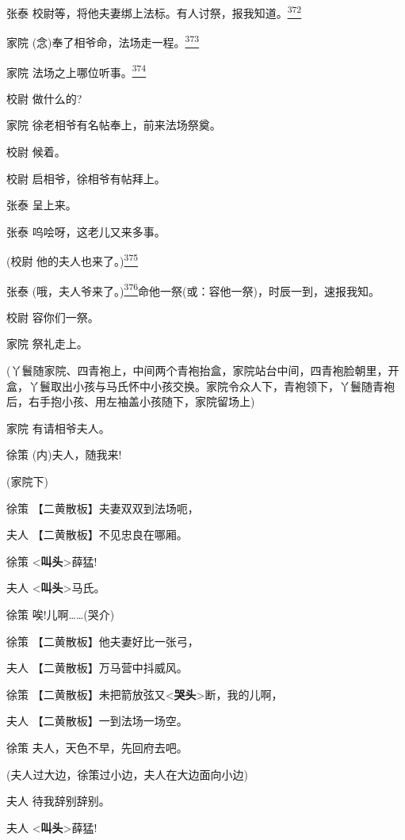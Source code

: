 张泰
校尉等，将他夫妻绑上法标。有人讨祭，报我知道。\protect\hyperlink{fn372}{\textsuperscript{372}}

家院
(念)奉了相爷命，法场走一程。\protect\hyperlink{fn373}{\textsuperscript{373}}

家院 法场之上哪位听事。\protect\hyperlink{fn374}{\textsuperscript{374}}

校尉 做什么的?

家院 徐老相爷有名帖奉上，前来法场祭奠。

校尉 候着。

校尉 启相爷，徐相爷有帖拜上。

张泰 呈上来。

张泰 呜哙呀，这老儿又来多事。

(校尉 他的夫人也来了。)\protect\hyperlink{fn375}{\textsuperscript{375}}

张泰
(哦，夫人爷来了。)\protect\hyperlink{fn376}{\textsuperscript{376}}命他一祭(或：容他一祭)，时辰一到，速报我知。

校尉 容你们一祭。

家院 祭礼走上。

(丫鬟随家院、四青袍上，中间两个青袍抬盒，家院站台中间，四青袍脸朝里，开盒，丫鬟取出小孩与马氏怀中小孩交换。家院令众人下，青袍领下，丫鬟随青袍后，右手抱小孩、用左袖盖小孩随下，家院留场上)

家院 有请相爷夫人。

徐策 (内)夫人，随我来!

(家院下)

徐策 【二黄散板】夫妻双双到法场呃，

夫人 【二黄散板】不见忠良在哪厢。

徐策 \textless{}\textbf{叫头}\textgreater{}薛猛!

夫人 \textless{}\textbf{叫头}\textgreater{}马氏。

徐策 唉!儿啊\ldots{}\ldots{}(哭介)

徐策 【二黄散板】他夫妻好比一张弓，

夫人 【二黄散板】万马营中抖威风。

徐策
【二黄散板】未把箭放弦又\textless{}\textbf{哭头}\textgreater{}断，我的儿啊，

夫人 【二黄散板】一到法场一场空。

徐策 夫人，天色不早，先回府去吧。

(夫人过大边，徐策过小边，夫人在大边面向小边)

夫人 待我辞别辞别。

夫人 \textless{}\textbf{叫头}\textgreater{}薛猛!

